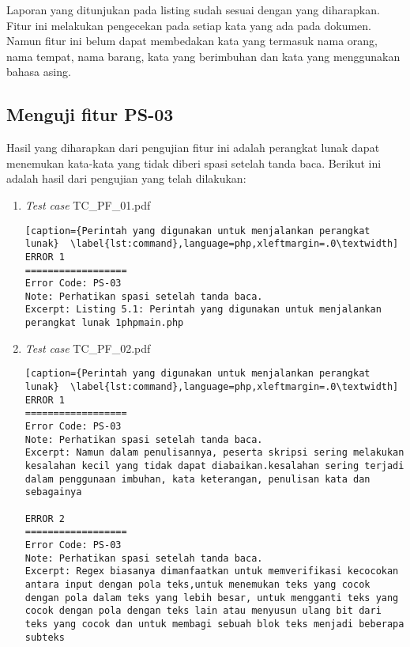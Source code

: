 Laporan yang ditunjukan pada listing sudah sesuai dengan yang diharapkan. Fitur ini melakukan pengecekan pada setiap kata yang ada pada dokumen. Namun fitur ini belum dapat membedakan kata yang termasuk nama orang, nama tempat, nama barang, kata yang berimbuhan dan kata yang menggunakan bahasa asing.

\subsection{Menguji fitur PS-03}
Hasil yang diharapkan dari pengujian fitur ini adalah perangkat lunak dapat menemukan kata-kata yang tidak diberi spasi setelah tanda baca. Berikut ini adalah hasil dari pengujian yang telah dilakukan:

\begin{enumerate}
	\item \textit{Test case} TC\_PF\_01.pdf
	
\begin{lstlisting}[caption={Perintah yang digunakan untuk menjalankan perangkat lunak}	\label{lst:command},language=php,xleftmargin=.0\textwidth]
ERROR 1
==================
Error Code: PS-03
Note: Perhatikan spasi setelah tanda baca.
Excerpt: Listing 5.1: Perintah yang digunakan untuk menjalankan perangkat lunak 1phpmain.php
\end{lstlisting}
	
	\item \textit{Test case} TC\_PF\_02.pdf
	
\begin{lstlisting}[caption={Perintah yang digunakan untuk menjalankan perangkat lunak}	\label{lst:command},language=php,xleftmargin=.0\textwidth]
ERROR 1
==================
Error Code: PS-03
Note: Perhatikan spasi setelah tanda baca.
Excerpt: Namun dalam penulisannya, peserta skripsi sering melakukan kesalahan kecil yang tidak dapat diabaikan.kesalahan sering terjadi dalam penggunaan imbuhan, kata keterangan, penulisan kata dan sebagainya

ERROR 2
==================
Error Code: PS-03
Note: Perhatikan spasi setelah tanda baca.
Excerpt: Regex biasanya dimanfaatkan untuk memverifikasi kecocokan antara input dengan pola teks,untuk menemukan teks yang cocok dengan pola dalam teks yang lebih besar, untuk mengganti teks yang cocok dengan pola dengan teks lain atau menyusun ulang bit dari teks yang cocok dan untuk membagi sebuah blok teks menjadi beberapa subteks
\end{lstlisting}
\end{enumerate}


